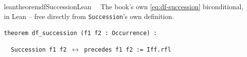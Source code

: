 \begin{restatable}{leantheorem}{dfSuccessionLean}~~ The book's own
\ref{eq:df-succession} biconditional, in Lean -- free directly from \texttt{Succession}'s own
definition.

\texttt{\textcolor{leancolor}{theorem} \textcolor{leanyellow}{df\_succession} (f1 f2 : Occurrence) :}

\texttt{~~Succession f1 f2 $\leftrightarrow$ precedes f1 f2 := Iff.rfl}
\label{df_succession}
\end{restatable}
